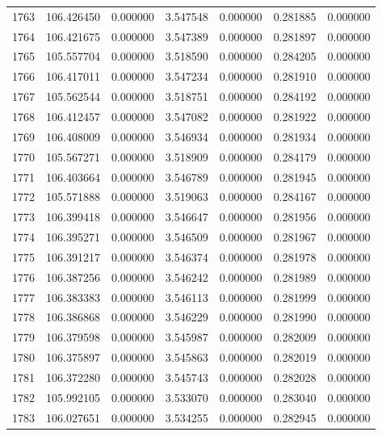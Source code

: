 \begin{tabular}{rrrrrrr}
1763 & 106.426450 &    0.000000 &  3.547548 &    0.000000 &    0.281885 &  0.000000 \\
1764 & 106.421675 &    0.000000 &  3.547389 &    0.000000 &    0.281897 &  0.000000 \\
1765 & 105.557704 &    0.000000 &  3.518590 &    0.000000 &    0.284205 &  0.000000 \\
1766 & 106.417011 &    0.000000 &  3.547234 &    0.000000 &    0.281910 &  0.000000 \\
1767 & 105.562544 &    0.000000 &  3.518751 &    0.000000 &    0.284192 &  0.000000 \\
1768 & 106.412457 &    0.000000 &  3.547082 &    0.000000 &    0.281922 &  0.000000 \\
1769 & 106.408009 &    0.000000 &  3.546934 &    0.000000 &    0.281934 &  0.000000 \\
1770 & 105.567271 &    0.000000 &  3.518909 &    0.000000 &    0.284179 &  0.000000 \\
1771 & 106.403664 &    0.000000 &  3.546789 &    0.000000 &    0.281945 &  0.000000 \\
1772 & 105.571888 &    0.000000 &  3.519063 &    0.000000 &    0.284167 &  0.000000 \\
1773 & 106.399418 &    0.000000 &  3.546647 &    0.000000 &    0.281956 &  0.000000 \\
1774 & 106.395271 &    0.000000 &  3.546509 &    0.000000 &    0.281967 &  0.000000 \\
1775 & 106.391217 &    0.000000 &  3.546374 &    0.000000 &    0.281978 &  0.000000 \\
1776 & 106.387256 &    0.000000 &  3.546242 &    0.000000 &    0.281989 &  0.000000 \\
1777 & 106.383383 &    0.000000 &  3.546113 &    0.000000 &    0.281999 &  0.000000 \\
1778 & 106.386868 &    0.000000 &  3.546229 &    0.000000 &    0.281990 &  0.000000 \\
1779 & 106.379598 &    0.000000 &  3.545987 &    0.000000 &    0.282009 &  0.000000 \\
1780 & 106.375897 &    0.000000 &  3.545863 &    0.000000 &    0.282019 &  0.000000 \\
1781 & 106.372280 &    0.000000 &  3.545743 &    0.000000 &    0.282028 &  0.000000 \\
1782 & 105.992105 &    0.000000 &  3.533070 &    0.000000 &    0.283040 &  0.000000 \\
1783 & 106.027651 &    0.000000 &  3.534255 &    0.000000 &    0.282945 &  0.000000 \\

\end{tabular}

